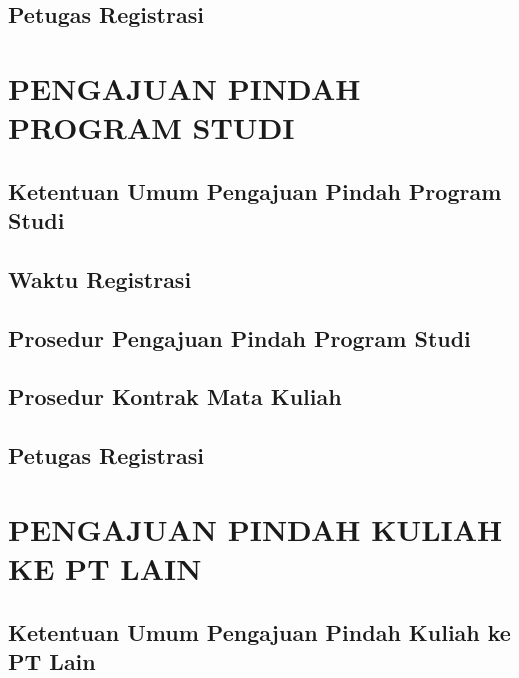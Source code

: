 \documentclass[
]{book}
\begin{document}
\hypertarget{petugas-registrasi}{%
\section{Petugas Registrasi}\label{petugas-registrasi}}

\hypertarget{pengajuan-pindah-program-studi}{%
\chapter{PENGAJUAN PINDAH PROGRAM STUDI}\label{pengajuan-pindah-program-studi}}

\hypertarget{ketentuan-umum-pengajuan-pindah-program-studi}{%
\section{Ketentuan Umum Pengajuan Pindah Program Studi}\label{ketentuan-umum-pengajuan-pindah-program-studi}}

\hypertarget{waktu-registrasi}{%
\section{Waktu Registrasi}\label{waktu-registrasi}}

\hypertarget{prosedur-pengajuan-pindah-program-studi}{%
\section{Prosedur Pengajuan Pindah Program Studi}\label{prosedur-pengajuan-pindah-program-studi}}

\hypertarget{prosedur-kontrak-mata-kuliah}{%
\section{Prosedur Kontrak Mata Kuliah}\label{prosedur-kontrak-mata-kuliah}}

\hypertarget{petugas-registrasi}{%
\section{Petugas Registrasi}\label{petugas-registrasi}}

\hypertarget{pengajuan-pindah-kuliah-ke-pt-lain}{%
\chapter{PENGAJUAN PINDAH KULIAH KE PT LAIN}\label{pengajuan-pindah-kuliah-ke-pt-lain}}

\hypertarget{ketentuan-umum-pengajuan-pindah-kuliah-ke-pt-lain}{%
\section{Ketentuan Umum Pengajuan Pindah Kuliah ke PT Lain}\label{ketentuan-umum-pengajuan-pindah-kuliah-ke-pt-lain}}
\end{document}
